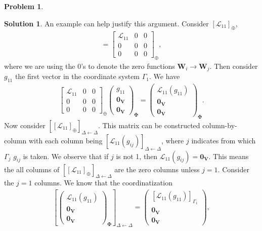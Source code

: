 \documentclass{book}
\theoremstyle{definition}
\newtheorem*{prob*}{Problem}
\newtheorem*{sln*}{Solution}
\newcommand{\V}{\mathbf{V}}
\newcommand{\W}{\mathbf{W}}
\newcommand{\lag}{\mathcal{L}}
\begin{document}
\begin{prob*}
\begin{sln*}
	An example can help justify this argument. Consider $[\lag_{11}]_\oplus$,
	\begin{align*}
	[\lag_{11}] = \begin{bmatrix}
	\lag_{11} & 0 & 0\\
	0 & 0 & 0\\
	0 & 0 & 0
	\end{bmatrix}_\oplus,
	\end{align*}
	where we are using the $0$'s to denote the zero functions $\W_i \to \W_j$. Then consider $g_{11}$ the first vector in the coordinate system $\Gamma_1$. We have
	\begin{align*}
	\begin{bmatrix}
	\lag_{11} & 0 & 0\\
	0 & 0 & 0\\
	0 & 0 & 0
	\end{bmatrix}_\oplus\begin{pmatrix}
	g_{11} \\ \mathbf{0}_\V \\ \mathbf{0}_\V
	\end{pmatrix}_\maltese = \begin{pmatrix}
	\lag_{11}(g_{11}) \\ \mathbf{0}_\V \\ \mathbf{0}_\V
	\end{pmatrix}_\maltese.
	\end{align*}
	Now consider $\left[[\lag_{11}]_\oplus\right]_{\Delta\leftarrow\Delta}$. This matrix can be constructed column-by-column with each column being $[\lag_{11}(g_{ij})]_{\Delta\leftarrow\Delta}$, where $j$ indicates from which $\Gamma_j$ $g_{ij}$ is taken. We observe that if $j$ is not 1, then $\lag_{11}(g_{ij}) = \mathbf{0}_\V$. This means the all columns of $\left[[\lag_{11}]_\oplus\right]_{\Delta\leftarrow\Delta}$ are the zero columns unless $j=1$. Consider the $j=1$ columns. We know that the coordinatization
	\begin{align*}
	\left[\begin{pmatrix}
	\lag_{11}(g_{11}) \\ \mathbf{0}_\V \\ \mathbf{0}_\V
	\end{pmatrix}_\maltese\right]_{\Delta\leftarrow\Delta}
	=
	\begin{pmatrix}
	[\lag_{11}(g_{11})]_{\Gamma_1} \\ \mathbf{0}_\V \\ \mathbf{0}_\V
	\end{pmatrix},
	\end{align*}

\end{sln*}
\end{prob*}
\end{document}
